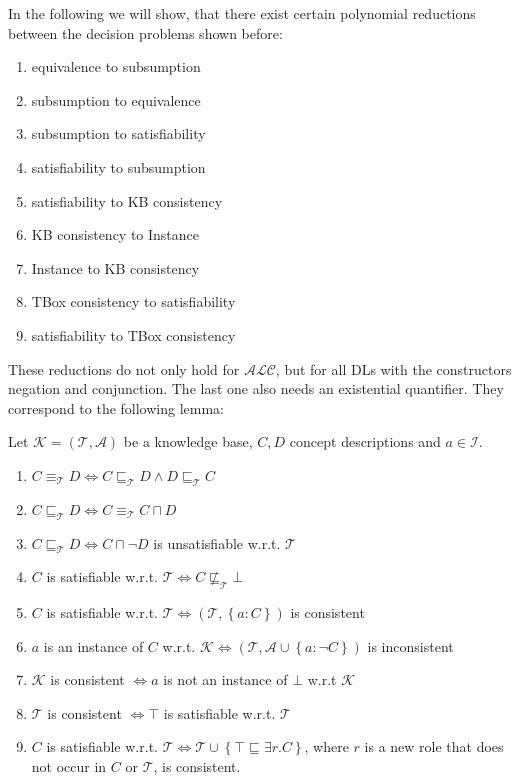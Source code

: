 \newpage
In the following we will show, that there exist certain polynomial reductions between the decision problems shown before:
\begin{enumerate}
	\item  equivalence to subsumption
	\item subsumption to equivalence
	\item subsumption to satisfiability
	\item satisfiability to subsumption
	\item satisfiability to KB consistency
	\item KB consistency to Instance
	\item Instance to KB consistency
	\item TBox consistency to satisfiability
	\item satisfiability to TBox consistency
\end{enumerate}
\begin{note}
	These reductions do not only hold for $\mathcal{ALC}$, but for all DLs with the constructors negation and conjunction.
	The last one also needs an existential quantifier.
	They correspond to the following lemma:
\end{note}

\begin{theorem}
	Let $\mathcal{K} = \left( \mathcal{T}, \mathcal{A} \right)$ be a knowledge base, 
	$C, D$ concept descriptions and $a \in \mathscr{I}$.
	\begin{enumerate}
		\item $C \equiv_{\mathcal{T}} D \iff C \sqsubseteq_{\mathcal{T}} D \land D \sqsubseteq_{\mathcal{T}} C$ 
		\item $C \sqsubseteq_{\mathcal{T}} D \iff C \equiv_{\mathcal{T}} C \sqcap D$
		\item $C \sqsubseteq_{\mathcal{T}} D \iff C \sqcap \neg D$ is unsatisfiable w.r.t. $\mathcal{T}$
		\item $C$ is satisfiable w.r.t. $\mathcal{T} \iff C \not\sqsubseteq_{\mathcal{T}} \bot$
		\item $C$ is satisfiable w.r.t. $\mathcal{T} \iff \left( \mathcal{T}, \left\{ a:C \right\} \right)$ is consistent
		\item $a$ is an instance of $C$ w.r.t. $\mathcal{K} \iff \left( \mathcal{T}, \mathcal{A} \cup \left\{ a: \neg C \right\} \right)$ is inconsistent
		\item $\mathcal{K}$ is consistent $\iff a$ is not an instance of $\bot$ w.r.t $\mathcal{K}$
		\item $\mathcal{T}$ is consistent $\iff \top$ is satisfiable w.r.t. $\mathcal{T}$
		\item $C$ is satisfiable w.r.t. $\mathcal{T} \iff \mathcal{T} \cup \left\{ \top \sqsubseteq \exists r.C \right\}$,
			where $r$ is a new role that does not occur in $C$ or $\mathcal{T}$,
			is consistent.
	\end{enumerate}
\end{theorem}

